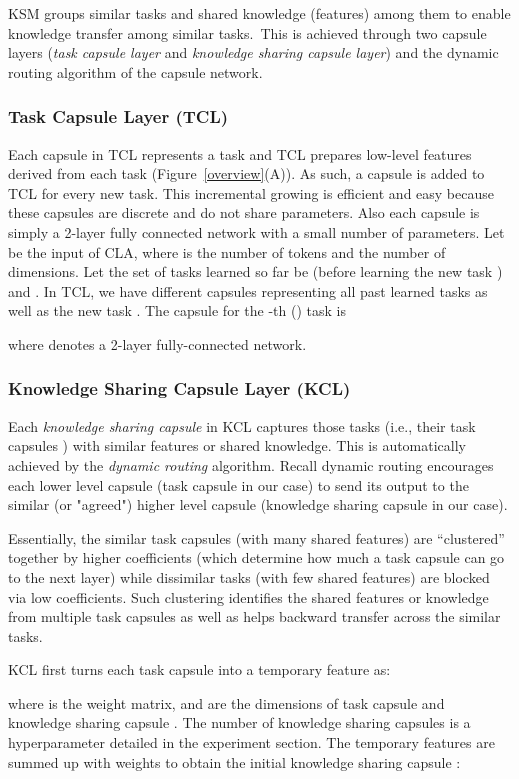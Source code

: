 \documentclass[11pt]{article}
\begin{document}
KSM groups similar tasks and shared knowledge (features) among them to enable knowledge transfer among similar tasks.~This is achieved through two capsule layers (\textit{task capsule layer} and \textit{knowledge sharing capsule layer}) and the dynamic routing algorithm of the capsule network.


\subsubsection{Task Capsule Layer (TCL)}
Each capsule in TCL represents a task and TCL prepares low-level features derived from each task (Figure~\ref{overview}(A)). As such, a capsule is added to TCL for every new task. This incremental growing is efficient and easy because these capsules are discrete and do not share parameters.
Also each capsule is simply a 2-layer fully connected network with a small number of parameters. Let  be the input of CLA, where  is the number of tokens and  the number of dimensions. Let the set of tasks learned so far be  (before learning the new task ) and . In TCL, we have  different capsules representing all past  learned tasks as well as the new task . 
The capsule for the -th () task is

where  denotes a 2-layer fully-connected network.

\subsubsection{Knowledge Sharing Capsule Layer (KCL)}
Each \textit{knowledge sharing capsule} in KCL captures those tasks (i.e., their task capsules ) with similar features or shared knowledge.  This is automatically achieved by the \textit{dynamic routing} algorithm. Recall dynamic routing encourages each lower level capsule (task capsule in our case) to send its output to the similar (or "agreed") higher level capsule (knowledge sharing capsule in our case).  

Essentially, the similar task capsules (with many shared features) are ``clustered'' together by higher coefficients (which determine how much a task capsule can go to the next layer) while dissimilar tasks (with few shared features) are blocked via low coefficients. Such clustering identifies the shared features or knowledge from multiple task capsules as well as helps backward transfer across the similar tasks.

KCL first turns each task capsule  into a temporary feature  
as:

where  is the weight matrix,  and  are the dimensions of task capsule  and knowledge sharing capsule . The number of knowledge sharing capsules is a hyperparameter detailed in the experiment section.
The temporary features are summed up with weights  to obtain the initial knowledge sharing capsule :
\end{document}
